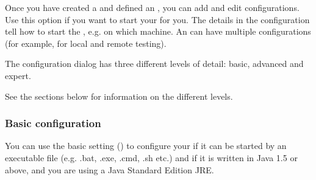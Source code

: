


Once you have created a \gdproject{}  and defined an \gdaut{} , you can add and edit \gdaut{} configurations. Use this option if you want \app{} to start your \gdaut{} for you. 
The details in the \gdaut{} configuration tell \app{} how to start the \gdaut{}, e.g. on which machine. 
An \gdaut{} can have multiple configurations (for example, for local and remote testing).  


The \gdaut{} configuration dialog has three different levels of detail: basic, advanced and expert. 

See the sections below for information on the different levels. 

\subsubsection{Basic \gdaut{} configuration}

You can use the basic setting () to configure your \gdaut{} if it can be started by an executable file (e.g. .bat, .exe, .cmd, .sh etc.) and if it is written in Java 1.5 or above, and you are using a Java Standard Edition JRE. 

